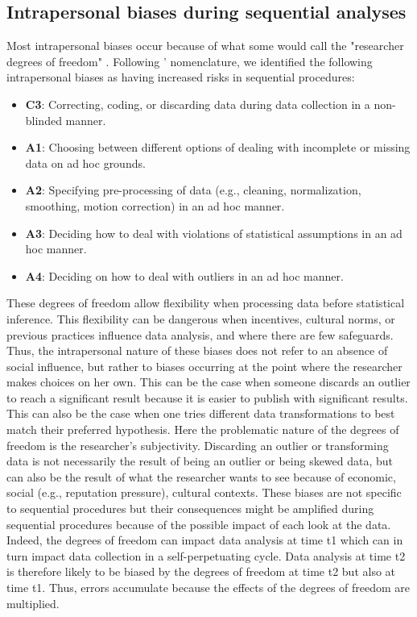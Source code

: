\documentclass[a4paper,jou,natbib,floatsintext,donotrepeattitle]{apa6}
\begin{document}
\subsection{Intrapersonal biases during sequential analyses}%

Most intrapersonal biases occur because of what some would call the "researcher degrees of freedom" \citep{simmons_false-positive_2011,wicherts_degrees_2016-1}. Following \cite{wicherts_degrees_2016-1}' nomenclature, we identified the following intrapersonal biases as having increased risks in sequential procedures: 

\begin{itemize}
    \item \textbf{C3}: Correcting, coding, or discarding data during data collection in a non-blinded manner.
    \item \textbf{A1}: Choosing between different options of dealing with incomplete or missing data on ad hoc grounds.
    \item \textbf{A2}: Specifying pre-processing of data (e.g., cleaning, normalization, smoothing, motion correction) in an ad hoc manner.
    \item \textbf{A3}: Deciding how to deal with violations of statistical assumptions in an ad hoc manner.
    \item \textbf{A4}: Deciding on how to deal with outliers in an ad hoc manner.
\end{itemize}

These degrees of freedom allow flexibility when processing data before statistical inference. This flexibility can be dangerous when incentives, cultural norms, or previous practices  influence data analysis, and where there are few safeguards. Thus, the intrapersonal nature of these biases does not refer to an absence of social influence, but rather to biases occurring at the point where the researcher makes choices on her own. This can be the case when someone discards an outlier to reach a significant result because it is easier to publish with significant results. This can also be the case when one tries different data transformations to best match their preferred hypothesis. Here the problematic nature of the degrees of freedom is the researcher's subjectivity. Discarding an outlier or transforming data is not necessarily the result of being an outlier or being skewed data, but can also be the result of what the researcher wants to see because of economic, social (e.g., reputation pressure), cultural contexts. These biases are not specific to sequential procedures but their consequences might be amplified during sequential procedures because of the possible impact of each look at the data. Indeed, the degrees of freedom can impact data analysis at time t1 which can in turn impact data collection in a self-perpetuating cycle. Data analysis at time t2 is therefore likely to be biased by the degrees of freedom at time t2 but also at time t1. Thus, errors accumulate because the effects of the degrees of freedom are multiplied. \par
\end{document}

